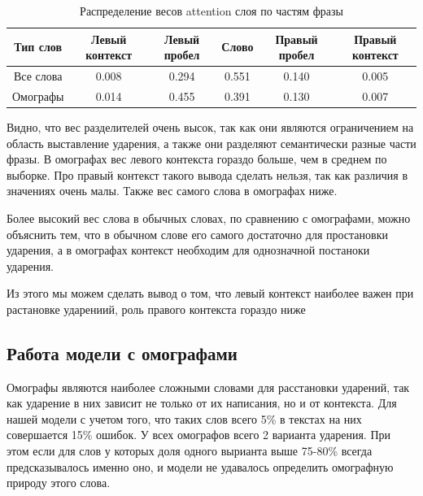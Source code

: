 \documentclass[14pt, a4paper, russian]{extreport}
\begin{document}
\begin{table}[H]
	\caption{Распределение весов attention слоя по частям фразы}
	
	\begin{small}
		\begin{center}
			\begin{tabular}{|c | c | c | c| c | c|}
				\hline
				Тип слов  & Левый контекст & Левый пробел & Слово & Правый пробел & Правый контекст \\ \hline
				Все слова & 0.008          & 0.294        & 0.551 & 0.140         & 0.005           \\ \hline
				Омографы  & 0.014          & 0.455        & 0.391 & 0.130         & 0.007           \\ \hline
			\end{tabular}
		\end{center}
	\end{small}
	\label{table:att_wei}
\end{table}

Видно, что вес разделителей очень высок, так как они являются ограничением на область выставление ударения, а также они разделяют семантически разные части фразы. В омографах вес левого контекста гораздо больше, чем в среднем по выборке. Про правый контекст такого вывода сделать нельзя, так как различия в значениях очень малы. Также вес самого слова в омографах ниже. 

Более высокий  вес слова  в обычных словах, по сравнению с омографами, можно объяснить тем, что в обычном слове его самого достаточно для простановки ударения, а в омографах контекст необходим для однозначной постаноки ударения.

Из этого мы можем сделать вывод о том, что левый контекст наиболее важен при растановке ударениий, роль правого контекста гораздо ниже

\subsection{Работа модели с омографами}
Омографы являются наиболее сложными словами для расстановки ударений, так как ударение в них зависит не только от их написания, но и от контекста.  Для нашей модели с учетом того, что таких слов всего 5\% в текстах на них совершается 15\% ошибок.  У всех омографов всего 2 варианта ударения. При этом если для слов у которых доля одного вырианта выше 75-80\% всегда предсказывалось именно оно, и модели не удавалось определить омографную природу этого слова.  
\end{document}
